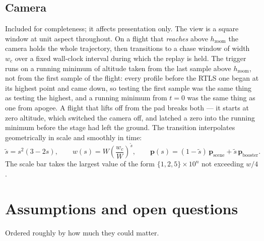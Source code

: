\documentclass[11pt,a4paper]{article}
\newcommand{\vect}[1]{\mathbf{#1}}
\begin{document}
\subsection{Camera}

Included for completeness; it affects presentation only. The view is a square
window at unit aspect throughout. On a flight that \emph{reaches} above
$h_{\mathrm{zoom}}$ the camera holds the whole trajectory, then transitions to a
chase window of width $w_c$ over a fixed wall-clock interval during which the
replay is held. The trigger runs on a running minimum of altitude taken from the
last sample above $h_{\mathrm{zoom}}$, not from the first sample of the flight:
every profile before the RTLS one began at its highest point and came down, so
testing the first sample was the same thing as testing the highest, and a
running minimum from $t=0$ was the same thing as one from apogee. A flight that
lifts off from the pad breaks both --- it starts at zero altitude, which switched
the camera off, and latched a zero into the running minimum before the stage had
left the ground.
The transition interpolates geometrically in scale and smoothly in time:
\begin{equation}
\tilde s = s^2(3-2s),
\qquad
w(s) = W\left(\frac{w_c}{W}\right)^{\tilde s},
\qquad
\vect{p}(s) = (1-\tilde s)\,\vect{p}_{\mathrm{scene}} + \tilde s\,\vect{p}_{\mathrm{booster}} .
\end{equation}
The scale bar takes the largest value of the form $\{1,2,5\}\times10^n$ not
exceeding $w/4$.

\section{Assumptions and open questions}
\label{sec:limits}

Ordered roughly by how much they could matter.
\end{document}

